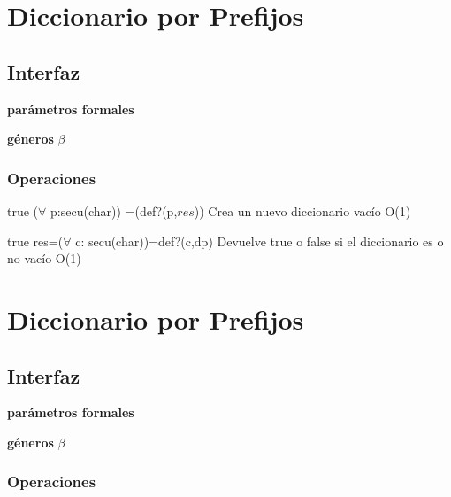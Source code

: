 \section{Diccionario por Prefijos}

\subsection{Interfaz}

  \textbf{par\'ametros formales}
  
  \textbf{g\'eneros} $\beta$\\
 





\subsubsection*{Operaciones}

{true}
{($\forall$ p:secu(char)) ¬(def?(p,$res$))}
{Crea un nuevo diccionario vac\'io}
{O(1)}
{}

{true}
{res=($\forall$ c: secu(char))¬def?(c,dp)}
{Devuelve true o false si el diccionario es o no vac\'io}
{O(1)}
{}

\section{Diccionario por Prefijos}

\subsection{Interfaz}

  \textbf{par\'ametros formales}
  
  \textbf{g\'eneros} $\beta$\\
 





\subsubsection*{Operaciones}

